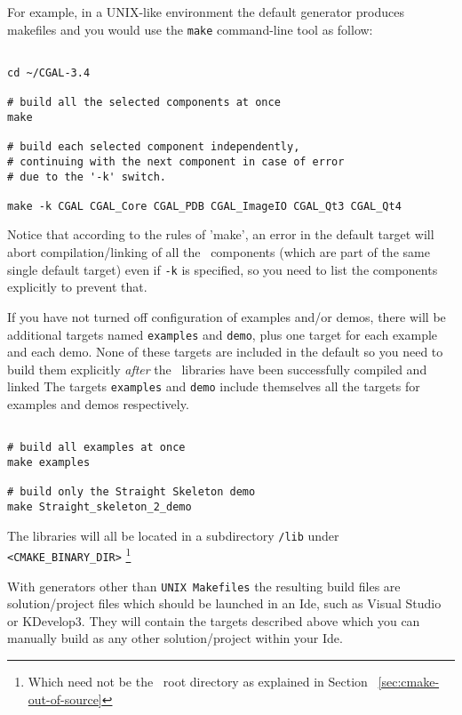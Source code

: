 For example, in a UNIX-like environment the default generator produces makefiles and you would
use the \texttt{make} command-line tool as follow:

{\ccTexHtml{\scriptsize}{}
\begin{verbatim}

cd ~/CGAL-3.4

# build all the selected components at once
make 

# build each selected component independently,
# continuing with the next component in case of error
# due to the '-k' switch.

make -k CGAL CGAL_Core CGAL_PDB CGAL_ImageIO CGAL_Qt3 CGAL_Qt4

\end{verbatim}
}

Notice that according to the rules of 'make', an error in the default target will abort compilation/linking of
all the \cgal\ components (which are part of the same single default target) even if {\tt -k} 
is specified, so you need to list the components explicitly to prevent that.

If you have not turned off configuration of examples and/or demos, there will be additional
targets named \texttt{examples} and \texttt{demo}, plus one target for each example and each demo.
None of these targets are included in the default so you need to build them explicitly
{\em after} the \cgal\ libraries have been successfully compiled and linked
The targets \texttt{examples} and \texttt{demo} include themselves all the targets
for examples and demos respectively.

{\ccTexHtml{\scriptsize}{}
\begin{verbatim}

# build all examples at once
make examples 

# build only the Straight Skeleton demo
make Straight_skeleton_2_demo

\end{verbatim}
}

The libraries will all be located in a subdirectory {\tt /lib} under {\tt <CMAKE\_BINARY\_DIR>}
\footnote{Which need not be the \cgal\ root directory as explained in Section ~\ref{sec:cmake-out-of-source}}

With generators other than {\tt UNIX Makefiles} the resulting build files are solution/project files which
should be launched in an {\sc Ide}, such as Visual Studio or KDevelop3. They will contain the targets described
above which you can manually build as any other solution/project within your {\sc Ide}.

